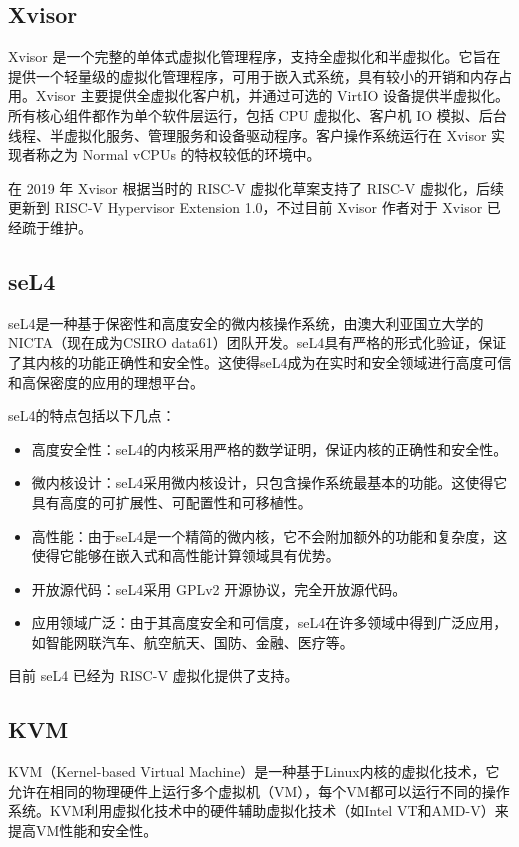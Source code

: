 \subsection{Xvisor}
Xvisor\cite{patel2015embedded} 是一个完整的单体式虚拟化管理程序，支持全虚拟化和半虚拟化。它旨在提供一个轻量级的虚拟化管理程序，可用于嵌入式系统，具有较小的开销和内存占用。Xvisor 主要提供全虚拟化客户机，并通过可选的 VirtIO 设备提供半虚拟化。所有核心组件都作为单个软件层运行，包括 CPU 虚拟化、客户机 IO 模拟、后台线程、半虚拟化服务、管理服务和设备驱动程序。客户操作系统运行在 Xvisor 实现者称之为 Normal vCPUs 的特权较低的环境中。

在 2019 年 Xvisor 根据当时的 RISC-V 虚拟化草案支持了 RISC-V 虚拟化，后续更新到 RISC-V Hypervisor Extension 1.0，不过目前 Xvisor 作者对于 Xvisor 已经疏于维护。

\subsection{seL4}
seL4\cite{klein2009sel4}是一种基于保密性和高度安全的微内核操作系统，由澳大利亚国立大学的 NICTA（现在成为CSIRO data61）团队开发。seL4具有严格的形式化验证，保证了其内核的功能正确性和安全性。这使得seL4成为在实时和安全领域进行高度可信和高保密度的应用的理想平台。

seL4的特点包括以下几点：
\begin{itemize}
    \item 高度安全性：seL4的内核采用严格的数学证明，保证内核的正确性和安全性。
    \item 微内核设计：seL4采用微内核设计，只包含操作系统最基本的功能。这使得它具有高度的可扩展性、可配置性和可移植性。
    \item 高性能：由于seL4是一个精简的微内核，它不会附加额外的功能和复杂度，这使得它能够在嵌入式和高性能计算领域具有优势。
    \item 开放源代码：seL4采用 GPLv2 开源协议，完全开放源代码。
    \item 应用领域广泛：由于其高度安全和可信度，seL4在许多领域中得到广泛应用，如智能网联汽车、航空航天、国防、金融、医疗等。
\end{itemize}

目前 seL4 已经为 RISC-V 虚拟化提供了支持。\cite{heiser2020sel4}

\subsection{KVM}

KVM（Kernel-based Virtual Machine）\cite{kivity2007kvm, zhao2020trap}是一种基于Linux内核的虚拟化技术，它允许在相同的物理硬件上运行多个虚拟机（VM），每个VM都可以运行不同的操作系统。KVM利用虚拟化技术中的硬件辅助虚拟化技术（如Intel VT和AMD-V）来提高VM性能和安全性。

